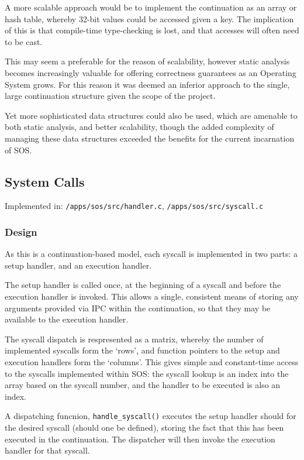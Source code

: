 \documentclass[a4paper,12pt]{article}
\begin{document}
A more scalable approach would be to implement the continuation as an array or
hash table, whereby 32-bit values could be accessed given a key.  The
implication of this is that compile-time type-checking is lost, and that
accesses will often need to be cast.

This may seem a preferable for the reason of scalability, however static
analysis becomes increasingly valuable for offering correctness guarantees as
an Operating System grows.  For this reason it was deemed an inferior approach
to the single, large continuation structure given the scope of the project.

Yet more sophisticated data structures could also be used, which are amenable
to both static analysis, and better scalability, though the added complexity
of managing these data structures exceeded the benefits for the current
incarnation of SOS.

\subsection{System Calls}
Implemented in: \texttt{/apps/sos/src/handler.c}, \texttt{/apps/sos/src/syscall.c}

\subsubsection{Design}
As this is a continuation-based model, each syscall is implemented in two
parts: a setup handler, and an execution handler.

The setup handler is called once, at the beginning of a syscall and before the
execution handler is invoked.  This allows a single, consistent means of
storing any arguments provided via IPC within the continuation, so that they
may be available to the execution handler.

The syscall dispatch is respresented as a matrix, whereby the number of
implemented syscalls form the `rows', and function pointers to the setup and
execution handlers form the `columns'.  This gives simple and constant-time
access to the syscalls implemented within SOS: the syscall lookup is an index
into the array based on the syscall number, and the handler to be executed is
also an index.

A dispatching funcnion, \texttt{handle\_syscall()} executes the setup handler
should for the desired syscall (should one be defined), storing the fact that
this has been executed in the continuation.  The dispatcher will then invoke
the execution handler for that syscall.
\end{document}
